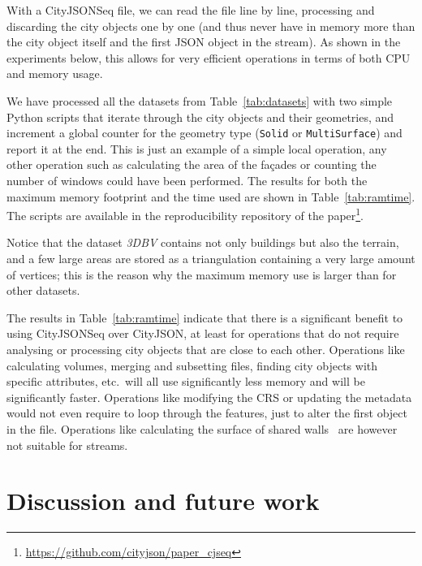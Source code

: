 \documentclass[11pt,halfparskip,parskip=half]{scrartcl}
\begin{document}
With a CityJSONSeq file, we can read the file line by line, processing and discarding the city objects one by one (and thus never have in memory more than the city object itself and the first JSON object in the stream).
As shown in the experiments below, this allows for very efficient operations in terms of both CPU and memory usage.

%

We have processed all the datasets from Table~\ref{tab:datasets} with two simple Python scripts that iterate through the city objects and their geometries, and increment a global counter for the geometry type (\texttt{Solid} or \texttt{MultiSurface}) and report it at the end.
This is just an example of a simple local operation, any other operation such as calculating the area of the façades or counting the number of windows could have been performed.
The results for both the maximum memory footprint and the time used are shown in Table~\ref{tab:ramtime}.
The scripts are available in the reproducibility repository of the paper\footnote{\url{https://github.com/cityjson/paper_cjseq}}.


Notice that the dataset \emph{3DBV} contains not only buildings but also the terrain, and a few large areas are stored as a triangulation containing a very large amount of vertices; this is the reason why the maximum memory use is larger than for other datasets.

%

The results in Table~\ref{tab:ramtime} indicate that there is a significant benefit to using CityJSONSeq over CityJSON, at least for operations that do not require analysing or processing city objects that are close to each other.
Operations like calculating volumes, merging and subsetting files, finding city objects with specific attributes, etc.\ will all use significantly less memory and will be significantly faster.
Operations like modifying the CRS or updating the metadata would not even require to loop through the features, just to alter the first object in the file.
Operations like calculating the surface of shared walls~\citep{Agugiaro22} are however not suitable for streams.


%
\section{Discussion and future work}%
\label{sec:discussion}
\end{document}
